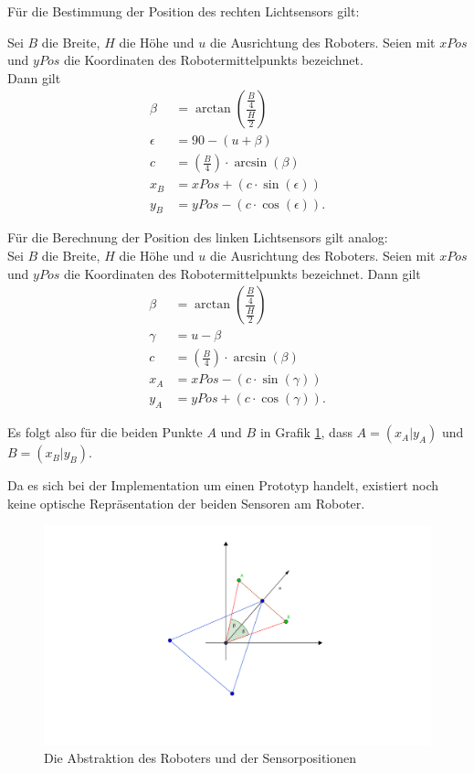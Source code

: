 \documentclass[paper=a4, DIV=calc, BCOR=12mm, twoside=on, onecolumn=on, open = right, titlepage =on, parskip =half-, headsepline = on, footsepline = off, chapterprefix = off, appendixprefix = on, fontsize = 12pt, numbers = noenddot, abstract = on]{scrbook}
\begin{document}
Für die Bestimmung der Position des rechten Lichtsensors gilt:

Sei $B$ die Breite, $H$ die Höhe und $u$ die Ausrichtung des Roboters. Seien mit $xPos$ und $yPos$ die Koordinaten des Robotermittelpunkts bezeichnet.\\
Dann gilt
\renewcommand\arraystretch{3}
\begin{align*}
\beta & = \arctan \left( \dfrac{\frac{B}{4}}{\frac{H}{2}} \right)\\
\epsilon & = 90 - (u + \beta)\\
c & = \left( \frac{B}{4} \right) \cdot \arcsin (\beta)\\
x_B & = xPos + \left( c \cdot \sin(\epsilon) \right)\\
y_B & = yPos - \left( c \cdot \cos(\epsilon) \right).
\end{align*}

Für die Berechnung der Position des linken Lichtsensors gilt analog:\\
Sei $B$ die Breite, $H$ die Höhe und $u$ die Ausrichtung des Roboters. Seien mit $xPos$ und $yPos$ die Koordinaten des Robotermittelpunkts bezeichnet. Dann gilt
\renewcommand\arraystretch{3}
\begin{align*}
\beta & = \arctan \left( \dfrac{\frac{B}{4}}{\frac{H}{2}} \right)\\
\gamma & = u - \beta\\
c & = \left( \frac{B}{4} \right) \cdot \arcsin (\beta)\\
x_A & = xPos - \left( c \cdot \sin(\gamma) \right)\\
y_A & = yPos + \left( c \cdot \cos(\gamma) \right).
\end{align*}

Es folgt also für die beiden Punkte $A$ und $B$ in Grafik \ref{fig:roboter_abstrakt}, dass $A = \left( x_A \vert y_A \right)$ und $B = \left( x_B \vert y_B \right)$.


Da es sich bei der Implementation um einen Prototyp handelt, existiert noch keine optische Repräsentation der beiden Sensoren am Roboter. 

\begin{figure}[htbp]
\centering
\includegraphics[width=\textwidth]{images/lichtsensorgrafik.png} 
\caption{Die Abstraktion des Roboters und der Sensorpositionen}
\label{fig:roboter_abstrakt}
\end{figure}
\end{document}
